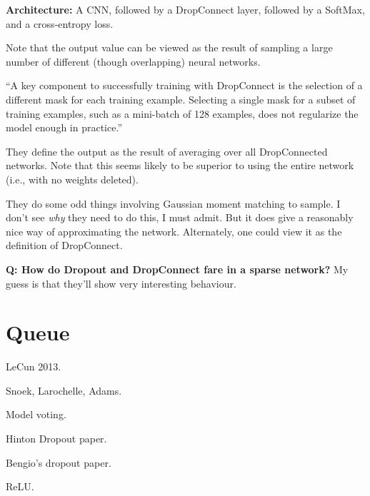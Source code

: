 \documentclass[12pt]{report}
\begin{document}
\textbf{Architecture:} A CNN, followed by a DropConnect layer,
followed by a SoftMax, and a cross-entropy loss.

Note that the output value can be viewed as the result of sampling a
large number of different (though overlapping) neural networks.

``A key component to successfully training with DropConnect is the
selection of a different mask for each training example.  Selecting a
single mask for a subset of training examples, such as a mini-batch of
128 examples, does not regularize the model enough in practice.''

They define the output as the result of averaging over all
DropConnected networks.  Note that this seems likely to be superior to
using the entire network (i.e., with no weights deleted).

They do some odd things involving Gaussian moment matching to sample.
I don't see \emph{why} they need to do this, I must admit.  But it
does give a reasonably nice way of approximating the network.
Alternately, one could view it as the definition of DropConnect.


\textbf{Q: How do Dropout and DropConnect fare in a sparse network?}
My guess is that they'll show very interesting behaviour.



\chapter{Queue}

LeCun 2013.

Snoek, Larochelle, Adams.

Model voting.

Hinton Dropout paper.

Bengio's dropout paper.

ReLU.
\end{document}
